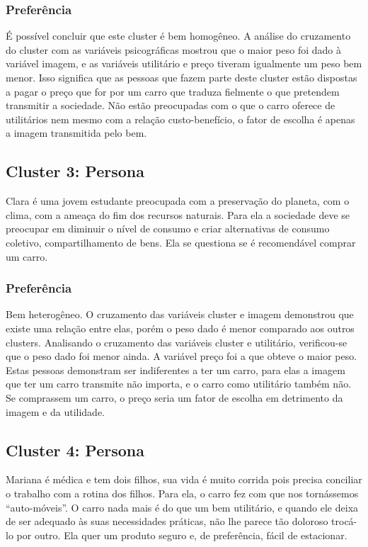 \subsubsection{Preferência}
É possível concluir que este cluster é bem homogêneo. A análise
do cruzamento do cluster com as variáveis psicográficas mostrou que
o maior peso foi dado à variável imagem, e as variáveis utilitário
e preço tiveram igualmente um peso bem menor. Isso significa que as
pessoas que fazem parte deste cluster estão dispostas a pagar o preço
que for por um carro que traduza fielmente o que pretendem transmitir
a sociedade. Não estão preocupadas com o que o carro oferece de utilitários
nem mesmo com a relação custo-benefício, o fator de escolha é apenas
a imagem transmitida pelo bem. 


\subsection{Cluster 3: Persona \nomeCc{} }

Clara é uma jovem estudante preocupada com a preservação
do planeta, com o clima, com a ameaça do fim dos recursos naturais.
Para ela a sociedade deve se preocupar em diminuir o nível de consumo
e criar alternativas de consumo coletivo, compartilhamento de bens.
Ela se questiona se é recomendável comprar um carro. 

\subsubsection{Preferência}
Bem heterogêneo. O cruzamento das variáveis cluster e imagem demonstrou que existe
uma relação entre elas, porém o peso dado é menor comparado aos outros
clusters. Analisando o cruzamento das variáveis cluster e utilitário,
verificou-se que o peso dado foi menor ainda. A variável preço foi
a que obteve o maior peso. Estas pessoas demonstram ser indiferentes
a ter um carro, para elas a imagem que ter um carro transmite não
importa, e o carro como utilitário também não. Se comprassem um carro,
o preço seria um fator de escolha em detrimento da imagem e da utilidade. 

\subsection{Cluster 4: Persona \nomeCd{} }

Mariana é médica e tem dois filhos, sua vida é muito corrida pois
precisa conciliar o trabalho com a rotina dos filhos. Para ela, o
carro fez com que nos tornássemos \textquotedblleft auto-móveis\textquotedblright .
O carro nada mais é do que um bem utilitário, e quando ele deixa de
ser adequado às suas necessidades práticas, não lhe parece tão doloroso
trocá-lo por outro. Ela quer um produto seguro e, de preferência,
fácil de estacionar. 


